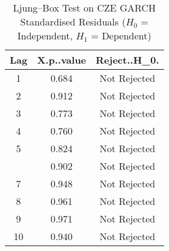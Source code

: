 \begin{table}[!h]
\centering
\caption{Ljung–Box Test on CZE GARCH Standardised Residuals ($H_0$ = Independent, $H_1$ = Dependent)}
\centering
\begin{tabular}[t]{ccc}
\toprule
Lag & X.p..value & Reject..H_0.\\
\midrule
1 & 0.684 & Not Rejected\\
2 & 0.912 & Not Rejected\\
3 & 0.773 & Not Rejected\\
4 & 0.760 & Not Rejected\\
5 & 0.824 & Not Rejected\\
\addlinespace
6 & 0.902 & Not Rejected\\
7 & 0.948 & Not Rejected\\
8 & 0.961 & Not Rejected\\
9 & 0.971 & Not Rejected\\
10 & 0.940 & Not Rejected\\
\bottomrule
\end{tabular}
\end{table}
